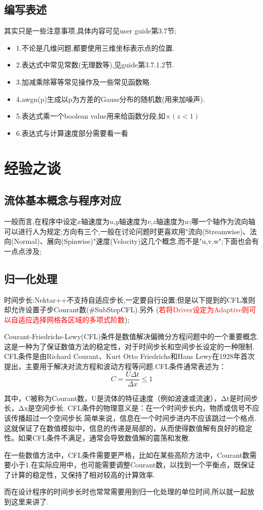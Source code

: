 \subsection{编写表述}
其实只是一些注意事项,具体内容可见user guide第3.7节;
\begin{itemize}
	\item{1.不论是几维问题,都要使用三维坐标表示点的位置.}
	\item{2.表达式中常见常数(无理数等),见guide第3.7.1.2节.}
	\item{3.加减乘除幂等常见操作及一些常见函数略.}
	\item{4.awgn(p)生成以p为方差的Gauss分布的随机数(用来加噪声).}
	\item{5.表达式乘一个boolean value用来给函数分段,如$\times (z<1)$}
	\item{6.表达式与计算速度部分需要看一看~}
\end{itemize}

\section{经验之谈}

\subsection{流体基本概念与程序对应}
一般而言,在程序中设定$x$轴速度为$u$,$y$轴速度为$v$,$z$轴速度为$w$;哪一个轴作为流向轴可以进行人为规定;方向有三个,一般在讨论问题时更喜欢用"流向(Streamwise)、法向(Normal)、展向(Spinwise)"速度(Velocity)这几个概念,而不是"u,v,w";下面也会有一点点涉及;


\subsection{归一化处理}


时间步长:Nektar++不支持自适应步长,一定要自行设置;但是以下提到的CFL准则却允许设置子步Courant数(\#SubStepCFL).另外
(\textcolor{red}{若将Driver设定为Adaptive则可以自适应选择网格各区域的多项式阶数});\par
Courant-Friedrichs-Lewy(CFL)条件是数值解决偏微分方程问题中的一个重要概念.这是一种为了保证数值方法的稳定性，对于时间步长和空间步长设定的一种限制.
CFL条件是由Richard Courant、Kurt Otto Friedrichs和Hans Lewy在1928年首次提出，主要用于解决对流方程和波动方程等问题.CFL条件通常表述为：
$$
C = \frac{U \Delta t}{\Delta x}\leq 1
$$
\par
其中，C被称为Courant数，U是流体的特征速度（例如波速或流速），Δt是时间步长，Δx是空间步长.
CFL条件的物理意义是：在一个时间步长内，物质或信号不应该传播超过一个空间步长.简单来说，信息在一个时间步进内不应该跳过一个格点.这就保证了在数值模拟中，信息的传递是局部的，从而使得数值解有良好的稳定性。如果CFL条件不满足，通常会导致数值解的震荡和发散.\par
在一些数值方法中，CFL条件需要更严格，比如在某些高阶方法中，Courant数需要小于1.在实际应用中，也可能需要调整Courant数，以找到一个平衡点，既保证了计算的稳定性，又保持了相对较高的计算效率.\par
而在设计程序的时间步长时也常常需要用到归一化处理的单位时间,所以就一起放到这里来讲了.\par

